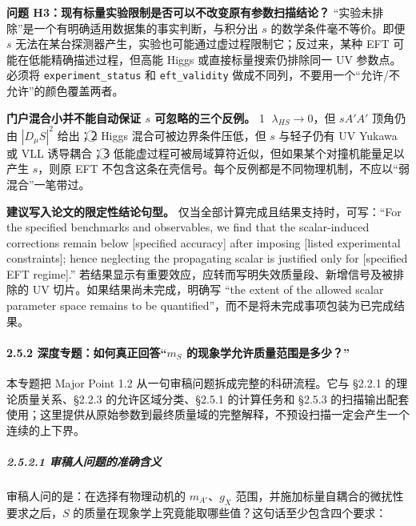 \documentclass[
  chinese,
  UTF8]{ctexart}
\begin{document}
\textbf{问题 H3：现有标量实验限制是否可以不改变原有参数扫描结论？}
``实验未排除''是一个有明确适用数据集的事实判断，与积分出 \(s\)
的数学条件毫不等价。即便 \(s\)
无法在某台探测器产生，实验也可能通过虚过程限制它；反过来，某种 EFT
可能在低能精确描述过程，但高能 Higgs 或直接标量搜索仍排除同一 UV
参数点。必须将 \texttt{experiment\_status} 和 \texttt{eft\_validity}
做成不同列，不要用一个``允许/不允许''的颜色覆盖两者。

\textbf{门户混合小并不能自动保证 \(s\) 可忽略的三个反例。}
\textcircled{1} \(\lambda_{HS}\to0\)，但 \(sA'A'\) 顶角仍由
\(|D_\mu S|^2\) 给出；\textcircled{2} Higgs 混合可被边界条件压低，但
\(s\) 与轻子仍有 UV Yukawa 或 VLL 诱导耦合；\textcircled{3}
低能虚过程可被局域算符近似，但如果某个对撞机能量足以产生 \(s\)，则原 EFT
不包含这条在壳信号。每个反例都是不同物理机制，不应以``弱混合''一笔带过。

\textbf{建议写入论文的限定性结论句型。}
仅当全部计算完成且结果支持时，可写：``For the specified benchmarks and
observables, we find that the scalar-induced corrections remain below
{[}specified accuracy{]} after imposing {[}listed experimental
constraints{]}; hence neglecting the propagating scalar is justified
only for {[}specified EFT regime{]}.''
若结果显示有重要效应，应转而写明失效质量段、新增信号及被排除的 UV
切片。如果结果尚未完成，明确写 ``the extent of the allowed scalar
parameter space remains to be
quantified''，而不是将未完成事项包装为已完成结果。

\paragraph{\texorpdfstring{2.5.2 深度专题：如何真正回答``\(m_S\)
的现象学允许质量范围是多少？''}{2.5.2 深度专题：如何真正回答``m\_S 的现象学允许质量范围是多少？''}}\label{ux6df1ux5ea6ux4e13ux9898ux5982ux4f55ux771fux6b63ux56deux7b54m_s-ux7684ux73b0ux8c61ux5b66ux5141ux8bb8ux8d28ux91cfux8303ux56f4ux662fux591aux5c11}

本专题把 Major Point 1.2 从一句审稿问题拆成完整的科研流程。它与 §2.2.1
的理论质量关系、§2.2.3 的允许区域分类、§2.5.1 的计算任务和 §2.5.3
的扫描输出配套使用；这里提供从原始参数到最终质量域的完整解释，不预设扫描一定会产生一个连续的上下界。

\subparagraph{2.5.2.1
审稿人问题的准确含义}\label{ux5ba1ux7a3fux4ebaux95eeux9898ux7684ux51c6ux786eux542bux4e49}

审稿人问的是：在选择有物理动机的 \(m_{A'}\)、\(g_X\)
范围，并施加标量自耦合的微扰性要求之后，\(S\)
的质量在现象学上究竟能取哪些值？这句话至少包含四个要求：
\end{document}

